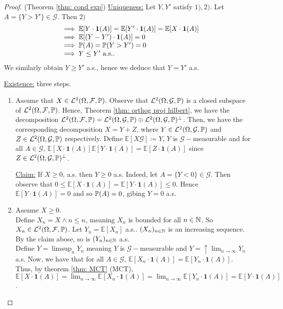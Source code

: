 \documentclass{article}
\begin{document}
\begin{proof}{(Theorem \ref{thm: cond exp})}
	\underline{Uniqueness:} Let $ Y, Y'$ satisfy $ 1), 2)$. Let $ A = \{Y > Y'\}\in\mathcal{G}$. Then $ 2) $  
	\[\begin{array}{ll}
	&\implies \mathbb{E}[Y\cdot\mathbf{1}(A)] =\mathbb{E}[Y'\cdot\mathbf{1}(A)]=\mathbb{E}[X\cdot\mathbf{1}(A)] \\
	&\implies\mathbb{E}[(Y-Y')\cdot\mathbf{1}(A)] = 0\\ 
	&\implies \mathbb{P}(A) = \mathbb{P}(Y>Y') = 0\\ 
	&\implies Y\leq Y' \text{ a.s.}.
	\end{array}
	\]
	We similarly obtain $ Y\geq Y'$ a.s., hence we deduce that $ Y = Y'$ a.s.

	\underline{Existence:} three steps. 
	\begin{enumerate}
		\item Assume that $ X \in\mathcal{L}^{2}(\Omega, \mathcal{F}, \mathbb{P})$. Observe that $\mathcal{L}^{2}(\Omega,\mathcal{G},\mathbb{P})$ is a closed subspace of $\mathcal{L}^{2}(\Omega, \mathcal{F}, \mathbb{P})$. Hence, Theorem \ref{thm: orthog proj hilbert}, we have the decomposition  $\mathcal{L}^{2}(\Omega, \mathcal{F}, \mathbb{P}) =\mathcal{L}^{2}(\Omega,\mathcal{G}, \mathbb{P})\oplus\mathcal{L}^{2}(\Omega,\mathcal{G}, \mathbb{P})^{\perp}$.
Then, we have the corresponding decomposition $ X = Y+Z$, where $ Y\in \mathcal{L}^{2}(\Omega,\mathcal{G}, \mathbb{P})$ and $ Z\in \mathcal{L}^{2}(\Omega,\mathcal{G}, \mathbb{P}) $ respectively. Define $\mathbb{E}[X\mathcal{G}]\coloneqq Y$, $ Y$ is $\mathcal{G}-$measurable and for all $ A\in\mathcal{G}$, $\mathbb{E}[X\cdot\mathbf{1}(A)]\mathbb{E}[Y\cdot\mathbf{1}(A)]=\mathbb{E}[Z\cdot\mathbf{1}(A)]$ since $ Z\in  \mathcal{L}^{2}(\Omega,\mathcal{G}, \mathbb{P})^{\perp}$.

\underline{Claim:} If $ X \geq 0$, a.s. then $ Y \geq 0$ a.s.
Indeed, let $ A = \{Y< 0\}\in\mathcal{G}$. Then observe that $ 0\leq\mathbb{E}[X\cdot\mathbf{1}(A)]=\mathbb{E}[Y\cdot\mathbf{1}(A)]\leq 0$. Hence $\mathbb{E}[Y\cdot\mathbf{1}(A)]=0$ and so $ \mathbb{P}(A) = 0$, gibing $ Y = 0$ a.s.

\item Assume $ X\geq 0 $.\\ 
	Define $ X_{n} = X\land n\leq n $, meaning $ X_{n}$ is bounded for all $ n\in \mathbb{N}$. So $ X_{n}\in\mathcal{L}^{2}(\Omega, \mathcal{F}, \mathbb{P})$. Let $ Y_{n} =\mathbb{E}[X_{n}]$ a.s.. $ (X_{n})_{n\in \mathbb{N}}$ is an increasing sequence. By the claim abose, so is $ (Y_{n})_{n\in \mathbb{N}}$ a.s.\\
	Define $ Y = \displaystyle \limsup_{n}Y_{n}$ meaning $ Y$ is $\mathcal{G}-$measurable and $ Y = \uparrow \displaystyle \lim_{n\to \infty}Y_{n} $ a.s. Now, we have that for all $ A\in\mathcal{G}$, $\mathbb{E}[X_{n}\cdot\mathbf{1}(A)] =\mathbb{E}[Y_{n}\cdot\mathbf{1}(A)]$. Thus, by theorem \ref{thm: MCT} (MCT), $\mathbb{E}[X\cdot\mathbf{1}(A)]= \displaystyle \lim_{n\to \infty} \mathbb{E}[X_{n}\cdot\mathbf{1}(A)] = \displaystyle \lim_{n\to \infty} \mathbb{E}[Y_{n}\cdot\mathbf{1}(A)] =\mathbb{E}[Y\cdot\mathbf{1}(A)]$.


\end{enumerate}
\end{proof}
\end{document}
